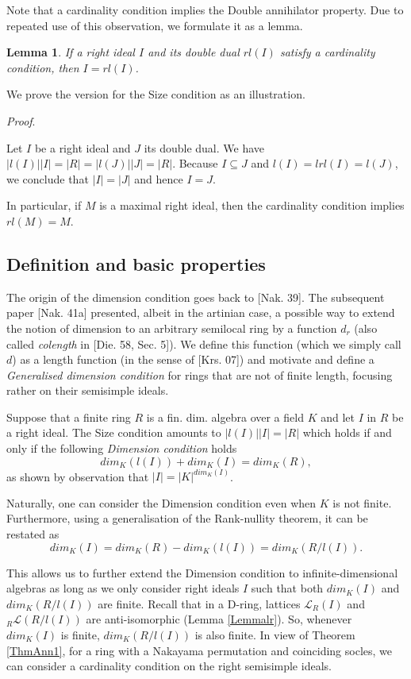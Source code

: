 \documentclass[11pt]{article}
\theoremstyle{plain}
\newtheorem{Lemma}[veta]{Lemma}
\theoremstyle{remark}
\theoremstyle{plain}
\newenvironment{Proof}{
  \par\medskip\noindent
  \textit{Proof}.
}{
\newline
\rightline{$\qedsymbol$}
}
\begin{document}
\smallskip

Note that a cardinality condition implies the Double annihilator property.  Due to repeated use of this observation, we formulate it as a lemma. 
\begin{Lemma}\label{LemmaDual}
    If a right ideal $I$ and its double dual $rl(I)$ satisfy a cardinality condition, then $I=rl(I)$.
\end{Lemma}
We prove the version for the Size condition as an illustration.
\begin{Proof}
    Let $I$ be a right ideal and $J$ its double dual. We have $|l(I)||I|=|R|=|l(J)||J|=|R|$. Because $I\subseteq J$ and $l(I)=lrl(I)=l(J)$, we conclude that $|I|=|J|$ and hence $I=J$.
\end{Proof}
In particular, if $M$ is a maximal right ideal, then the cardinality condition implies $rl(M)=M$.

\subsection{Definition and basic properties}\label{SecCardDef}


The origin of the dimension condition goes back to [Nak. 39]. The subsequent paper [Nak. 41a] presented, albeit in the artinian case, a possible way to extend the notion of dimension to an arbitrary semilocal ring by a function $d_r$ (also called \textit{colength} in [Die. 58, Sec. 5]). We define this function (which we simply call $d$) as a length function (in the sense of [Krs. 07]) and motivate and define a \textit{Generalised dimension condition} for rings that are not of finite length, focusing rather on their semisimple ideals.

\smallskip 

Suppose that a finite ring $R$ is a fin. dim. algebra over a field $K$ and let $I$ in $R$ be a right ideal. The Size condition amounts to  $|l(I)||I|=|R|$  which holds if and only if the following  \textit{Dimension condition} holds
\[dim_K(l(I))+dim_K(I)=dim_K(R),\]
as shown by observation that $|I|=|K|^{dim_K(I)}$. 

Naturally, one can consider the Dimension condition even when $K$ is not finite. Furthermore, using a generalisation of the Rank-nullity theorem, it can be restated as 
\[dim_K(I)=dim_K(R)-dim_K(l(I))=dim_K(R/l(I)).\]

This allows us to further extend the Dimension condition to infinite-dimensional algebras as long as we only consider right ideals $I$ such that both $dim_K(I)$ and $dim_K(R/l(I))$ are finite. Recall that in a D-ring,  lattices $\mathcal{L}_R(I)$ and $_R\mathcal{L}(R/l(I))$ are anti-isomorphic (Lemma \ref{Lemmalr}). So, whenever $dim_K(I)$ is finite, $dim_K(R/l(I))$ is also finite.  In view of Theorem \ref{ThmAnn1}, for a ring with a Nakayama permutation and coinciding socles, we can consider a cardinality condition on the right semisimple ideals.
\end{document}
